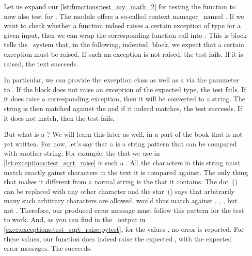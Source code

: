Let us expand our \cref{lst:functions:test_my_math_2} for testing the  function to now also test for .
The  module offers a so-called context manager~\cite{PSF2024CUFWSC} named .
If we want to check whether a function indeed raises a certain exception of type  for a given input, then we can wrap the corresponding function call into .
This is block tells the \pytest\ system that, in the following, indented, block, we expect that a certain exception must be raised.
If such an exception is not raised, the test fails.
If it is raised, the text succeeds.

%
%
%
%
In particular, we can provide the exception class as well as a  via the parameter~ to .
If the block does not raise an exception of the expected type, the test fails.
If it does raise a corresponding exception, then it will be converted to a string.
The string is then matched against the  and if it indeed matches, the test succeeds.
If it does not match, then the test fails.%
%
\begin{sloppypar}%
But what is a ?
We will learn this later as well, in a part of the book that is not yet written.
For now, let's say that a  is a string pattern that can be compared with another string.
For example, the  that we use in \cref{lst:exceptions:test_sqrt_raise} is such a .
All the  characters in this string must match exactly gainst characters in the text it is compared against.
The only thing that makes it different from a normal string is the  that it contains.
The dot~() can be replaced with any other character and the star~(\textil{*}) says that arbitrarily many such arbitrary characters are allowed.
 would thus match against , , , but not .
Therefore, our produced error message must follow this pattern for the test to work.
And, as you can find in the \pytest\ output in \cref{exec:exceptions:test_sqrt_raise:pytest}, for the values , no error is reported.
For these values, our  function does indeed raise the expected , with the expected error messages.
The  succeeds.%
\end{sloppypar}%
